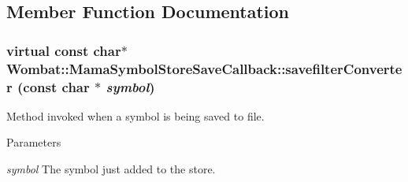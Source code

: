 \subsection{Member Function Documentation}
\hypertarget{classWombat_1_1MamaSymbolStoreSaveCallback_ab723041d8f1937b1c2f348ed98769609}{
\subsubsection[{savefilterConverter}]{\setlength{\rightskip}{0pt plus 5cm}virtual const char$\ast$ Wombat::MamaSymbolStoreSaveCallback::savefilterConverter (const char $\ast$ {\em symbol})}}
\label{classWombat_1_1MamaSymbolStoreSaveCallback_ab723041d8f1937b1c2f348ed98769609}


Method invoked when a symbol is being saved to file. 
\begin{DoxyParams}{Parameters}
\item[{\em symbol}]The symbol just added to the store. \end{DoxyParams}

